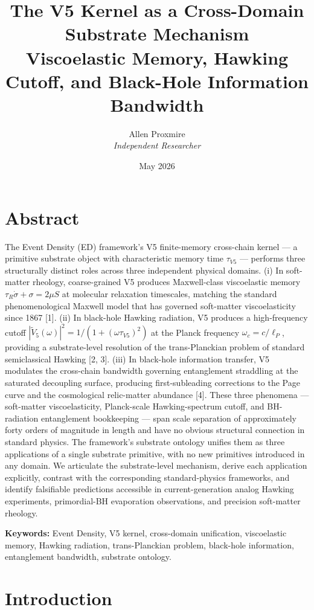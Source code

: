 \documentclass[11pt,a4paper]{article}
\title{\vspace{-1cm}\Large\bfseries The V5 Kernel as a Cross-Domain Substrate Mechanism\\[6pt]
\large\mdseries Viscoelastic Memory, Hawking Cutoff, and Black-Hole Information Bandwidth}
\author{Allen Proxmire \\ \textit{Independent Researcher}}
\date{May 2026}
\begin{document}
\maketitle

\section*{Abstract}

The Event Density (ED) framework's V5 finite-memory cross-chain kernel --- a primitive substrate object with characteristic memory time $\tau_{V5}$ --- performs three structurally distinct roles across three independent physical domains. (i) In soft-matter rheology, coarse-grained V5 produces Maxwell-class viscoelastic memory $\tau_R \dot\sigma + \sigma = 2\mu S$ at molecular relaxation timescales, matching the standard phenomenological Maxwell model that has governed soft-matter viscoelasticity since 1867 [1]. (ii) In black-hole Hawking radiation, V5 produces a high-frequency cutoff $|\tilde V_5(\omega)|^{2} = 1/(1+(\omega\tau_{V5})^{2})$ at the Planck frequency $\omega_c = c/\ell_P$, providing a substrate-level resolution of the trans-Planckian problem of standard semiclassical Hawking [2, 3]. (iii) In black-hole information transfer, V5 modulates the cross-chain bandwidth governing entanglement straddling at the saturated decoupling surface, producing first-subleading corrections to the Page curve and the cosmological relic-matter abundance [4]. These three phenomena --- soft-matter viscoelasticity, Planck-scale Hawking-spectrum cutoff, and BH-radiation entanglement bookkeeping --- span scale separation of approximately forty orders of magnitude in length and have no obvious structural connection in standard physics. The framework's substrate ontology unifies them as three applications of a single substrate primitive, with no new primitives introduced in any domain. We articulate the substrate-level mechanism, derive each application explicitly, contrast with the corresponding standard-physics frameworks, and identify falsifiable predictions accessible in current-generation analog Hawking experiments, primordial-BH evaporation observations, and precision soft-matter rheology.

\textbf{Keywords:} Event Density, V5 kernel, cross-domain unification, viscoelastic memory, Hawking radiation, trans-Planckian problem, black-hole information, entanglement bandwidth, substrate ontology.

\section{Introduction}
\end{document}
